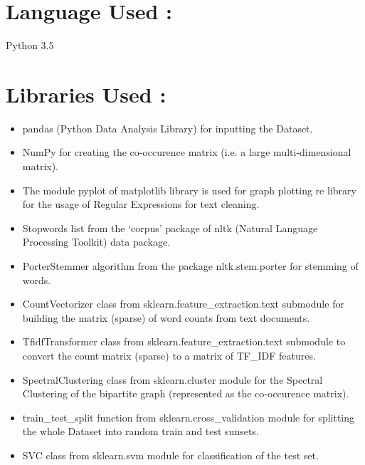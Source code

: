 \documentclass{report}
\begin{document}
\section{Language Used :}
Python 3.5
\section{Libraries Used :}
\begin{itemize}[label=$\circ$]
\item pandas (Python Data Analysis Library) for inputting the Dataset.
\item NumPy for creating the co-occurence matrix (i.e. a large multi-dimensional matrix).
\item The module pyplot of matplotlib library is used for graph plotting
re library for the usage of Regular Expressions for text cleaning.

\item Stopwords list from the ‘corpus’ package of nltk (Natural Language Processing Toolkit) data package.

\item PorterStemmer algorithm from the package nltk.stem.porter for stemming of words.

\item CountVectorizer class from sklearn.feature\_extraction.text submodule for building the matrix (sparse) of word counts from text documents.

\item TfidfTransformer class from sklearn.feature\_extraction.text submodule to convert the count matrix (sparse) to a matrix of TF\_IDF features.
\item SpectralClustering class from sklearn.cluster module for the Spectral Clustering of the bipartite graph (represented as the co-occurence matrix).
\item train\_test\_split function from sklearn.cross\_validation module for splitting the whole Dataset into random train and test sunsets.

\item SVC class from sklearn.svm module for classification of the test set.
\end{itemize}
 



\end{document}
